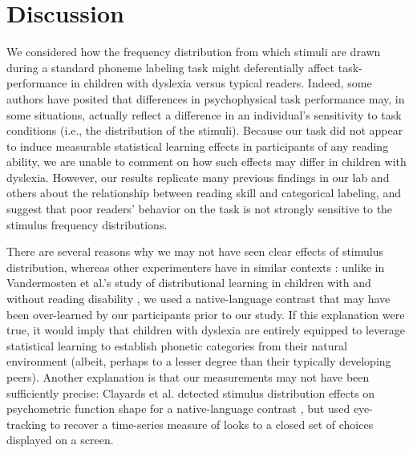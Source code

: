 \documentclass[../uwthesis.tex]{subfiles}
\begin{document}
\section{Discussion}
We considered how the frequency distribution from which stimuli are drawn during a standard phoneme labeling task might deferentially affect task-performance in children with dyslexia versus typical readers. Indeed, some authors have posited that differences in psychophysical task performance may, in some situations, actually reflect a difference in an individual's sensitivity to task conditions (i.e., the distribution of the stimuli). Because our task did not appear to induce measurable statistical learning effects in participants of any reading ability, we are unable to comment on how such effects may differ in children with dyslexia. However, our results replicate many previous findings in our lab and others about the relationship between reading skill and categorical labeling, and suggest that poor readers' behavior on the task is not strongly sensitive to the stimulus frequency distributions.

There are several reasons why we may not have seen clear effects of stimulus distribution, whereas other experimenters have in similar contexts \citep{Vandermosten2018StatisticalChildren,Clayards2008PerceptionCues}: unlike in Vandermosten et al.'s study of distributional learning in children with and without reading disability \citep{Vandermosten2018StatisticalChildren}, we used a native-language contrast that may have been over-learned by our participants prior to our study. If this explanation were true, it would imply that children with dyslexia are entirely equipped to leverage statistical learning to establish phonetic categories from their natural environment (albeit, perhaps to a lesser degree than their typically developing peers). Another explanation is that our measurements may not have been sufficiently precise: Clayards et al. detected stimulus distribution effects on psychometric function shape for a native-language contrast \citep{Clayards2008PerceptionCues}, but used eye-tracking to recover a time-series measure of looks to a closed set of choices displayed on a screen. 
\end{document}
